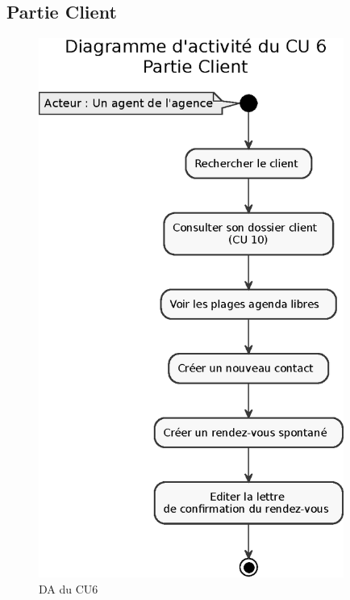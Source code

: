 \subsection{Partie Client}
\begin{figure}[H]
\centering
\includegraphics[width=10cm]{figures/eps/DA_CU6_partieClient.eps}
\caption{DA du CU6}
\end{figure}

